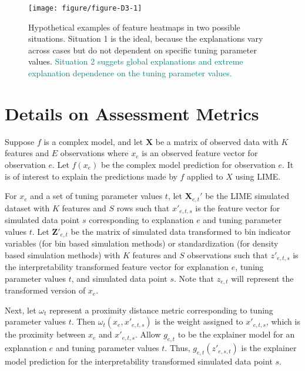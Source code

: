 \documentclass[AMS,STIX2COL]{WileyNJD-v2}\usepackage[]{graphicx}\usepackage[]{color}
\newenvironment{knitrout}{}{} %
\newcommand{\kge}[1]{\textcolor{teal}{#1}}
\renewcommand{\sout}[1]{\unskip}
\begin{document}
\begin{figure}[!t]
\begin{knitrout}
\color{fgcolor}

{\centering \texttt{[image: figure/figure-D3-1]} 

}



\end{knitrout}
\caption{Hypothetical examples of feature heatmaps in two possible situations. \sout{The heatmaps show the top feature chosen for 10 cases across 5 different sets of tuning parameter values. The color of the cell indicates the feature chosen by LIME.} Situation 1 is the ideal, because the explanations vary across cases but do not dependent on specific tuning parameter values. \kge{Situation 2 suggets global explanations and extreme explanation dependence on the tuning parameter values.}}
\label{fig:figure-D3}
\end{figure}

\section{Details on Assessment Metrics} \label{metric-details}

Suppose $f$ is a complex model, and let $\textbf{X}$ be a matrix of observed data with $K$ features and $E$ observations where $x_e$ is an observed feature vector for observation $e$. Let $f(x_e)$ be the complex model prediction for observation $e$. It is of interest to explain the predictions made by $f$ applied to $X$ using LIME. 

For $x_e$ and a set of tuning parameter values $t$, let $\textbf{X}_{e,t}'$ be the LIME simulated dataset with $K$ features and $S$ rows such that $x'_{e,t,s}$ is the feature vector for simulated data point $s$ corresponding to explanation $e$ and tuning parameter values $t$. Let $\textbf{Z}'_{e,t}$ be the matrix of simulated data transformed to bin indicator variables (for bin based simulation methods) or standardization (for density based simulation methods) with $K$ features and $S$ observations such that $z'_{e,t,s}$ is the interpretability transformed feature vector for explanation $e$, tuning parameter values $t$, and simulated data point $s$. Note that $z_{e,t}$ will represent the  transformed version of $x_e$.

Next, let $\omega_t$ represent a proximity distance metric corresponding to tuning parameter values $t$. Then $\omega_t\left(x_e, x'_{e,t,s}\right)$ is the weight assigned to $x'_{e,t,s}$, which is the proximity between $x_e$ and $x'_{e,t,s}$. Allow $g_{e,t}$ to be the explainer model for an explanation $e$ and tuning parameter values $t$. Thus, $g_{e,t}\left(z'_{e,s,t}\right)$ is the explainer model prediction for the interpretability transformed simulated data point $s$.
\end{document}
